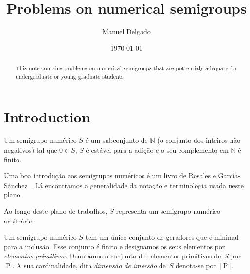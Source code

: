 \documentclass[12pt]{amsart}
\title{Problems on numerical semigroups}
\author{Manuel Delgado}
\date{\today}
\numberwithin{table}{section}
\numberwithin{figure}{section}
\numberwithin{equation}{section}
\DeclareMathOperator{\primitivesoper}{P} %
\theoremstyle{definition}
\theoremstyle{remark}
\begin{document}



\begin{abstract}
  
This note contains problems on numerical semigroups that are pottentialy adequate for undergraduate or young graduate students
  
\end{abstract}

\maketitle

\section{Introduction}\label{sec:introduction}

Um semigrupo numérico \(S\) é um subconjunto de \(\mathbb{N}\) (o conjunto dos inteiros não negativos) tal que \(0 \in S\), \(S\) é estável para a adição e o seu complemento em \(\mathbb{N}\) é finito.

Uma boa introdução aos semigrupos numéricos é um livro de Rosales e García-Sánchez~\cite{RosalesGarcia2009Book-Numerical}. Lá encontramos a generalidade da notação e terminologia usada neste plano.

Ao longo deste plano de trabalhos, \(S\) representa um semigrupo numérico arbitrário. 

Um semigrupo numérico \(S\) tem um único conjunto de geradores que é minimal para a inclusão. Esse conjunto é finito e designamos os seus elementos por \emph{elementos primitivos}. Denotamos o conjunto dos elementos primitivos de~\(S\) por~\(\primitivesoper\). A sua cardinalidade, dita \emph{dimensão de imersão} de~\(S\) denota-se por~\(\lvert \primitivesoper\rvert\).
\end{document}
